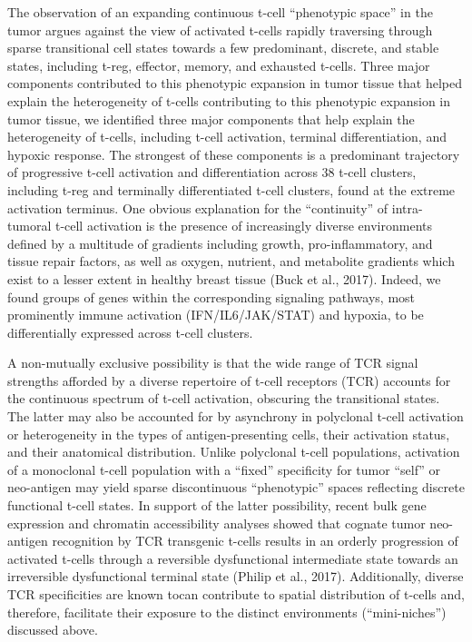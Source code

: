 The observation of an expanding continuous t-cell ``phenotypic space'' in the tumor argues against the view of activated t-cells rapidly traversing through sparse transitional cell states towards a few predominant, discrete, and stable states, including t-reg, effector, memory, and exhausted t-cells. 
Three major components contributed to this phenotypic expansion in tumor tissue that helped explain the heterogeneity of t-cells contributing to this phenotypic expansion in tumor tissue, we identified three major components that help explain the heterogeneity of t-cells, including t-cell activation, terminal differentiation, and hypoxic response. 
The strongest of these components is a predominant trajectory of progressive t-cell activation and differentiation across 38 t-cell clusters, including t-reg and terminally differentiated t-cell clusters, found at the extreme activation terminus. 
One obvious explanation for the ``continuity'' of intra-tumoral t-cell activation is the presence of increasingly diverse environments defined by a multitude of gradients including growth, pro-inflammatory, and tissue repair factors, as well as oxygen, nutrient, and metabolite gradients which exist to a lesser extent in healthy breast tissue (Buck et al., 2017).  %
Indeed, we found groups of genes within the corresponding signaling pathways, most prominently immune activation (IFN/IL6/JAK/STAT) and hypoxia, to be differentially expressed across t-cell clusters.

A non-mutually exclusive possibility is that the wide range of TCR signal strengths afforded by a diverse repertoire of t-cell receptors (TCR) accounts for the continuous spectrum of t-cell activation, obscuring the transitional states. 
The latter may also be accounted for by asynchrony in polyclonal t-cell activation or heterogeneity in the types of antigen-presenting cells, their activation status, and their anatomical distribution. 
Unlike polyclonal t-cell populations, activation of a monoclonal t-cell population with a ``fixed'' specificity for tumor ``self'' or neo-antigen may yield sparse discontinuous ``phenotypic'' spaces reflecting discrete functional t-cell states. 
In support of the latter possibility, recent bulk gene expression and chromatin accessibility analyses showed that cognate tumor neo-antigen recognition by TCR transgenic t-cells results in an orderly progression of activated t-cells through a reversible dysfunctional intermediate state towards an irreversible dysfunctional terminal state (Philip et al., 2017). %
Additionally, diverse TCR specificities are known tocan contribute to spatial distribution of t-cells and, therefore, facilitate their exposure to the distinct environments (``mini-niches'') discussed above. 

